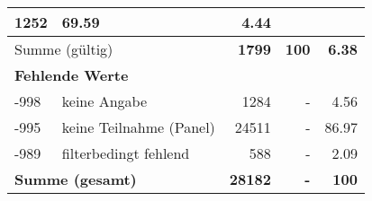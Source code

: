 \begin{longtable}{lXrrr}
       \num{1252} &
       \num[round-mode=places,round-precision=2]{69.59} &
         \num[round-mode=places,round-precision=2]{4.44} \\
     \midrule
     \multicolumn{2}{l}{Summe (gültig)} &
       \textbf{\num{1799}} &
     \textbf{100} &
       \textbf{\num[round-mode=places,round-precision=2]{6.38}} \\
     \multicolumn{5}{l}{\textbf{Fehlende Werte}}\\
       -998 &
       keine Angabe &
         \num{1284} &
        - &
         \num[round-mode=places,round-precision=2]{4.56} \\
       -995 &
       keine Teilnahme (Panel) &
         \num{24511} &
        - &
         \num[round-mode=places,round-precision=2]{86.97} \\
       -989 &
       filterbedingt fehlend &
         \num{588} &
        - &
         \num[round-mode=places,round-precision=2]{2.09} \\
     \midrule
     \multicolumn{2}{l}{\textbf{Summe (gesamt)}} &
          \textbf{\num{28182}} &
        \textbf{-} &
        \textbf{100} \\
     \bottomrule
     \end{longtable}
     
